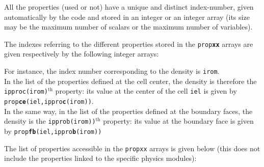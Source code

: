 {{{\begin{list}{-}{}

\item All the properties (used or not) have a unique and distinct index-number,
given automatically by the code and stored in an integer or an integer array
(its size may be the maximum number of scalars
or the maximum number of variables).

\item The indexes referring to the different properties stored in the
\texttt{prop{\bf xx}} arrays are given respectively by the following integer arrays:




\end{list}

For instance, the index number corresponding to the density is \texttt{irom}.\\
In the list of the properties defined at the cell center, the density
is therefore the \texttt{ipproc(irom)}$^{\text{th}}$
property: its value at the center of the cell \texttt{iel} is given by \texttt{prop{\bf ce}(iel,ippro{\bf c}(irom))}.\\
In the same way, in the list of the properties defined at the boundary
faces, the density is the
\texttt{ipprob(irom))}$^{\text{th}}$ property: its value at the boundary
face is given by \texttt{prop{\bf fb}(iel,ippro{\bf b}(irom))}

The list of properties accessible in the \texttt{propxx} arrays is given below (this does
not include the properties linked to the specific physics modules):



}}}
